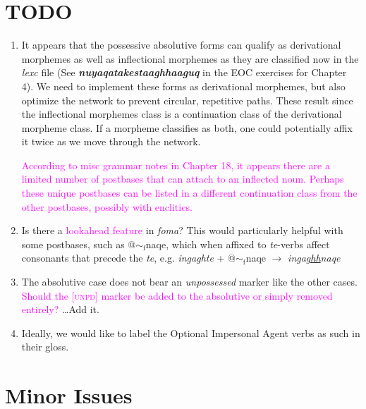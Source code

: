 \documentclass{article}
\begin{document}
\section{TODO}

\begin{enumerate}
\item It appears that the possessive absolutive forms can qualify as derivational morphemes as well as inflectional morphemes as they are classified now in the \textit{lexc} file (See \textit{\textbf{nuyaqatakestaaghhaaguq}} in the EOC exercises for Chapter 4).
%
We need to implement these forms as derivational morphemes, but also optimize the network to prevent circular, repetitive paths.
%
These result since the inflectional morphemes class is a continuation class of the derivational morpheme class.
%
If a morpheme classifies as both, one could potentially affix it twice as we move through the network.

\textcolor{magenta}{According to misc grammar notes in Chapter 18, it appears there are a limited number of postbases that can attach to an inflected noun.
%
Perhaps these unique postbases can be listed in a different continuation class from the other postbases, possibly with enclitics.}

\item Is there a \textcolor{magenta}{lookahead feature} in \textit{foma}? This would particularly helpful with some postbases, such as @${\sim}_\text{f}$naqe, which when affixed to \textit{te}-verbs affect consonants that precede the \textit{te}, e.g. \textit{ingaghte} + @${\sim}_\text{f}$naqe $\rightarrow$ \textit{inga\uline{ghh}naqe}

\item The absolutive case does not bear an \textit{unpossessed} marker like the other cases. \textcolor{magenta}{Should the [\textsc{unpd}] marker be added to the absolutive or simply removed entirely?} \ldots Add it.

\item Ideally, we would like to label the Optional Impersonal Agent verbs as such in their gloss.

\end{enumerate}


\section{Minor Issues}
\end{document}
